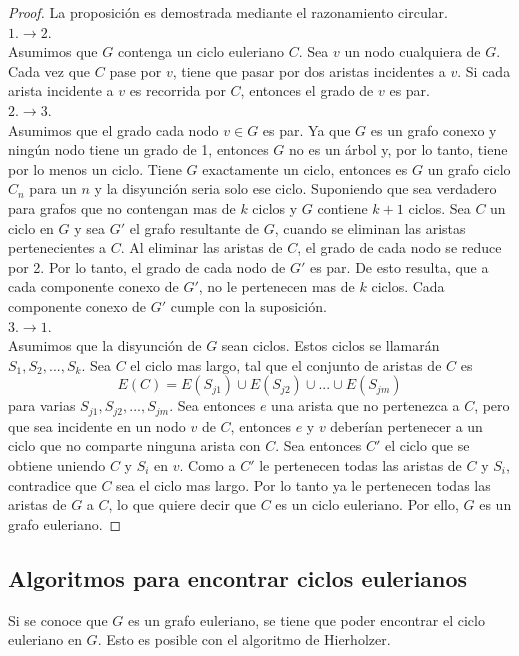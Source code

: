 \documentclass[12pt]{article}
\begin{document}
\begin{proof}
La proposición es demostrada mediante el razonamiento circular.
\\$1. \rightarrow 2.$
\\Asumimos que $G$ contenga un ciclo euleriano $C$. Sea $v$ un nodo cualquiera de $G$. Cada vez que $C$ pase por $v$, tiene que pasar por dos aristas incidentes a $v$. Si cada arista incidente a $v$ es recorrida por $C$, entonces el grado de $v$ es par.
\\$2. \rightarrow 3.$
\\Asumimos que el grado cada nodo $v \in G$ es par. Ya que $G$ es un grafo conexo y ningún nodo tiene un grado de 1, entonces $G$ no es un árbol y, por lo tanto, tiene por lo menos un ciclo. Tiene $G$ exactamente un ciclo, entonces es $G$ un grafo ciclo $C_{n}$ para un $n$ y la disyunción seria solo ese ciclo. Suponiendo que sea verdadero para grafos que no contengan mas de $k$ ciclos y $G$ contiene $k+1$ ciclos. Sea $C$ un ciclo en $G$ y sea $G'$ el grafo resultante de $G$, cuando se eliminan las aristas pertenecientes a $C$. Al eliminar las aristas de $C$, el grado de cada nodo se reduce por 2. Por lo tanto, el grado de cada nodo de $G'$ es par. De esto resulta, que a cada componente conexo de $G'$, no le pertenecen mas de $k$ ciclos. Cada componente conexo de $G'$ cumple con la suposición.
\\$3. \rightarrow 1.$
\\Asumimos que la disyunción de $G$ sean ciclos. Estos ciclos se llamarán $S_{1}, S_{2}, ..., S_{k}$. Sea $C$ el ciclo mas largo, tal que el conjunto de aristas de $C$ es $$E(C)=E(S_{j1}) \cup E(S_{j2}) \cup ... \cup E(S_{jm})$$ para varias $S_{j1}, S_{j2}, ..., S_{jm}$. Sea entonces $e$ una arista que no pertenezca a $C$, pero que sea incidente en un nodo $v$ de $C$, entonces $e$ y $v$ deberían pertenecer a un ciclo que no comparte ninguna arista con $C$. Sea entonces $C'$ el ciclo que se obtiene uniendo $C$ y $S_{i}$ en $v$. Como a $C'$ le pertenecen todas las aristas de $C$ y $S_{i}$, contradice que $C$ sea el ciclo mas largo. Por lo tanto ya le pertenecen todas las aristas de $G$ a $C$, lo que quiere decir que $C$ es un ciclo euleriano. Por ello, $G$ es un grafo euleriano.
\end{proof}
\subsection{Algoritmos para encontrar ciclos eulerianos}
Si se conoce que $G$ es un grafo euleriano, se tiene que poder encontrar el ciclo euleriano en $G$. Esto es posible con el algoritmo de Hierholzer.
\end{document}
